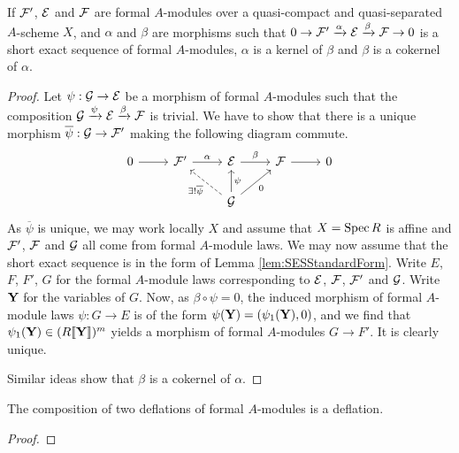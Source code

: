 \documentclass[../main.tex]{subfiles}
\begin{document}
\begin{lem}
  If $\mathcal{F}'$, $\mathcal{E}$ and $\mathcal{F}$ are formal $A$-modules over a quasi-compact and quasi-separated $A$-scheme $X$,
  and $\alpha$ and $\beta$ are morphisms such that 
  $0 \to \mathcal{F}' \xrightarrow{\alpha} \mathcal{E} \xrightarrow{\beta} \mathcal{F} \to 0$ 
  is a short exact sequence of formal $A$-modules, $\alpha$ is a kernel of
  $\beta$ and $\beta$ is a cokernel of $\alpha$. 
\begin{proof}
  Let $\psi: \mathcal{G} \to \mathcal{E}$ be a morphism of formal $A$-modules such that
  the composition $\mathcal{G} \xrightarrow{\psi} \mathcal{E} \xrightarrow{\beta} \mathcal{F}$ is trivial. 
  We have to show that there is a unique morphism $\overline \psi: \mathcal{G} \to 
  \mathcal{F}'$ making the following diagram commute.
  \begin{equation*}
    \begin{tikzcd}[ampersand replacement=\&]
    	0 \& {\cF'} \& \cE \& \cF \& 0 \\
    	\&\& \cG
    	\arrow[from=1-1, to=1-2]
    	\arrow["\alpha", from=1-2, to=1-3]
    	\arrow["\beta", from=1-3, to=1-4]
    	\arrow[from=1-4, to=1-5]
    	\arrow["{\exists!\overline \psi}", dashed, from=2-3, to=1-2]
    	\arrow["{\psi}"', from=2-3, to=1-3]
    	\arrow["0"', from=2-3, to=1-4]
    \end{tikzcd}
  \end{equation*}
  As $\overline \psi$ is unique, we may work locally $X$ and assume that $X =
  \operatorname{Spec} R$ is affine and 
  $\mathcal{F}'$, $\mathcal{F}$ and $\mathcal{G}$ all come from formal $A$-module laws. We may
  now assume that the short exact sequence is in the form of Lemma
  \ref{lem:SESStandardForm}. Write $E$, $F$, $F'$, $G$ for the 
  formal $A$-module laws corresponding to $\mathcal{E}$, $\mathcal{F}$, $\mathcal{F}'$ and 
  $\mathcal{G}$. Write $\mathbf{Y}$ for the variables of $G$. Now, as 
  $\beta \circ \psi = 0$, the induced morphism of
  formal $A$-module laws $\psi: G \to E$ is of the form $\psi(\mathbf{Y}) =
  (\psi_1(\mathbf{Y}), 0)$, and we find that $\psi_1(\mathbf{Y}) \in (R\llbracket \mathbf{Y} \rrbracket)^m$
  yields a morphism of formal $A$-modules $G \to F'$. It is clearly unique. 
  
  Similar ideas show that $\beta$ is a cokernel of $\alpha$. 
\end{proof}

\end{lem}

\begin{lem}
  The composition of two deflations of formal $A$-modules is a deflation.
\begin{proof}
\end{proof}
\end{lem}
\end{document}
